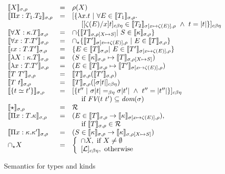 \documentclass{article}
\newcommand{\choice}[0]{\zeta}
\newcommand{\elcap}[0]{\cap}
\newcommand{\interp}[1]{\llbracket #1 \rrbracket}
\newcommand{\cbe}[0]{c\beta\eta}
\begin{document}
\begin{figure}
\[
\begin{array}{lll}
\interp{X}_{\sigma,\rho} & = & \rho(X) \\ 
\interp{\Pi x : T_1. T_2}_{\sigma,\rho} & = & 
    [\{ \lambda x.t\ |\ \forall E\in\interp{T_1}_{\sigma,\rho}.\\
\ &\ &\ \ \ \  [[\choice(E)/x]t]_{\cbe}\in\interp{T_2}_{\sigma[x\mapsto \choice(E)],\rho} \ \wedge\ t = |t|\}]_{\cbe}
 \\
\interp{\forall X:\kappa.T}_{\sigma,\rho} & = & 
  \elcap \{ \interp{T}_{\sigma,\rho[X\mapsto S]} |\ S\in\interp{\kappa}_{\sigma,\rho} \}  \\ 
\interp{\forall x:T.T'}_{\sigma,\rho} & = & 
  \elcap_\star \{ \interp{T'}_{\sigma[x\mapsto \choice(E)],\rho}\ |\ E\in\interp{T}_{\sigma,\rho} \} \\ 
\interp{\iota x:T.T'}_{\sigma,\rho} & = & \{ E\in\interp{T}_{\sigma,\rho} |\ E \in \interp{T'}_{\sigma[x\mapsto \choice(E)],\rho} \} \\ 
\interp{\lambda X:\kappa.T}_{\sigma,\rho} & = & (S\in\interp{\kappa}_{\sigma,\rho} \mapsto \interp{T}_{\sigma,\rho[X\mapsto S]}) 
\\ 
\interp{\lambda x:T.T'}_{\sigma,\rho} & = & 
    (E\in\interp{T}_{\sigma,\rho} \mapsto \interp{T'}_{\sigma[x\mapsto \choice(E)],\rho}) 
\\ 
\interp{T\ T'}_{\sigma,\rho} & = & \interp{T}_{\sigma,\rho}(\interp{T'}_{\sigma,\rho})
\\ 
\interp{T\ t}_{\sigma,\rho} & = & \interp{T}_{\sigma,\rho}([\sigma |t|]_{\cbe})
\\
\interp{\{t \simeq t'\}}_{\sigma,\rho} & = & [\{ t''\ |\ \sigma |t| =_{\beta\eta} \sigma |t'|\ \wedge\ t'' = |t''| \}]_{\cbe} \\
\ &\ &\ \ \ \textnormal{ if }\textit{FV}(t\ t')\subseteq\textit{dom}(\sigma) 
\\
\interp{\star}_{\sigma,\rho} & = & \mathcal{R} \\ 
\interp{\Pi x:T.\kappa}_{\sigma,\rho} & = & 
(E\in\interp{T}_{\sigma,\rho} \to \interp{\kappa}_{\sigma[x\mapsto \choice(E)],\rho}),\\
\ &\ &\ \ \ \textnormal{ if }\interp{T}_{\sigma,\rho}\in\mathcal{R} \\
\interp{\Pi x:\kappa.\kappa'}_{\sigma,\rho} & = & (S\in\interp{\kappa}_{\sigma,\rho} \to \interp{\kappa}_{\sigma,\rho[X\mapsto S]}) \\
\elcap_\star X & = & \left\{\begin{array}{l}
                                         \, \negthinspace\elcap X, \textnormal{ if } X\neq\emptyset\\
                                         \, \negthinspace[\mathcal{L}]_{\cbe},\textnormal{ otherwise}
                                       \end{array}\right. \\
\end{array}
\]
\caption{Semantics for types and kinds}
\label{fig:semtp}
\end{figure}
\end{document}
